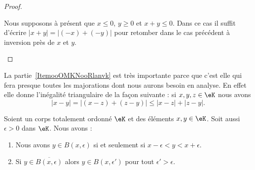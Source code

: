 \begin{proof}
\begin{subproof}
\begin{enumerate}
                    Nous supposons à présent que \( x\leq 0\), \( y\geq 0\) et \( x+y\leq 0\). Dans ce cas il suffit d'écrire \( | x+y |=| (-x)+(-y) |\) pour retomber dans le cas précédent à inversion près de \( x\) et \( y\).
            \end{enumerate}
    \end{subproof}
\end{proof}

\begin{remark}      \label{RemooJCAUooKkuglX}
    La partie~\ref{ItemooOMKNooRlanvk} est très importante parce que c'est elle qui fera presque toutes les majorations dont nous aurons besoin en analyse. En effet elle donne l'inégalité triangulaire de la façon suivante : si \( x,y,z\in \eK\) nous avons
    \begin{equation}
        | x-y |= |  (x-z)+(z-y) |\leq | x-z |+| z-y |.
    \end{equation}
\end{remark}

\begin{lemma}
    Soient un corps totalement ordonné \( \eK\) et des éléments \( x,y\in \eK\). Soit aussi \( \epsilon>0\) dans \( \eK\). Nous avons :
    \begin{enumerate}
        \item       \label{ITEMooXJGVooSebiip}
            Nous avons \( y\in B(x,\epsilon)\) si et seulement si \( x-\epsilon<y<x+\epsilon\).
        \item       \label{ITEMooRUBBooRayiMs}
            Si \( y\in  \overline{ B(x,\epsilon) }  \) alors \( y\in B(x,\epsilon')\) pour tout \( \epsilon'>\epsilon\).
    \end{enumerate}
\end{lemma}

